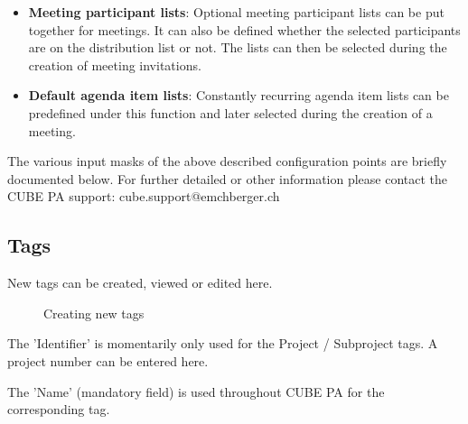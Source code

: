 \begin{itemize}
\item
\textbf{Meeting participant lists}: Optional meeting participant lists can be put together for meetings. It can also be defined whether the selected participants are on the distribution list or not. The lists can then be selected during the creation of meeting invitations.
\item
\textbf{Default agenda item lists}: Constantly recurring agenda item lists can be predefined under this function and later selected during the creation of a meeting.
\end{itemize}

\vspace{\baselineskip}

The various input masks of the above described configuration points are briefly documented below. For further detailed or other information please contact the CUBE PA support: {\color{red} cube.support@emchberger.ch}

\subsection{Tags}

New tags can be created, viewed or edited here.

\begin{figure}[H]
\caption{Creating new tags}
\end{figure}

The 'Identifier' is momentarily only used for the Project / Subproject tags. A project number can be entered here.

\vspace{\baselineskip}

The 'Name' (mandatory field) is used throughout CUBE PA for the corresponding tag.

\vspace{\baselineskip}

